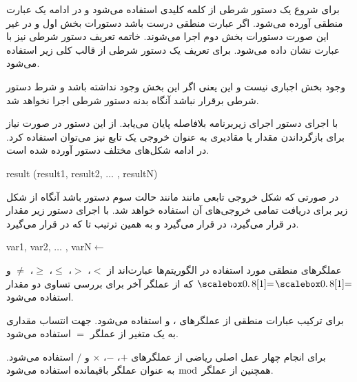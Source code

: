 برای شروع یک دستور شرطی از کلمه کلیدی {} استفاده می‌شود و در ادامه یک عبارت منطقی آورده می‌شود. اگر عبارت منطقی درست باشد دستورات بخش اول و در غیر این صورت دستورات بخش دوم اجرا می‌شوند. خاتمه تعریف دستور شرطی نیز با  عبارت {} نشان داده می‌شود. برای تعریف یک دستور شرطی از قالب کلی زیر استفاده می‌شود.
\begin{latin}
\begin{algorithmic}[1]
	\State	{}
\Else
	\State	{}
\EndIf
\end{algorithmic}
\end{latin}
وجود بخش {} اجباری نیست و این یعنی اگر این بخش وجود نداشته باشد و شرط دستور شرطی برقرار نباشد آنگاه بدنه دستور شرطی اجرا نخواهد شد.

با اجرای دستور {} اجرای زیربرنامه بلافاصله پایان می‌یابد. از این دستور در صورت نیاز برای بازگرداندن مقدار یا مقادیری به عنوان خروجی یک تابع نیز می‌توان استفاده کرد. در ادامه شکل‌های مختلف دستور {} آورده شده است.
\begin{latin}
\begin{algorithmic}[1]
\State	\Return
\State	\Return result
\State	\Return (result1, result2, $\ldots$ , resultN)
\end{algorithmic}
\end{latin}
در صورتی که شکل خروجی تابعی مانند {} مانند حالت سوم دستور {} باشد آنگاه از شکل زیر برای دریافت تمامی خروجی‌های آن استفاده خواهد شد. با اجرای دستور زیر مقدار {} در {} قرار می‌گیرد، {} در {} قرار می‌گیرد و به همین ترتیب تا {} که در {} قرار می‌گیرد.
\begin{latin}
\begin{algorithmic}[1]
\State	var1, var2, $\ldots$ , varN$\gets$
\end{algorithmic}
\end{latin}
عملگرهای منطقی مورد استفاده در الگوریتم‌ها عبارت‌اند از {$<$}، {$>$}، {$\leq$}، {$\geq$}، {$\neq$} و {$\isequal$} که از عملگر آخر برای بررسی تساوی دو مقدار استفاده می‌شود.

برای ترکیب عبارات منطقی از عملگرهای {}، {} و {} استفاده می‌شود. جهت انتساب مقداری به یک متغیر از عملگر {$=$} استفاده می‌شود.

برای انجام چهار عمل اصلی ریاضی از عملگرهای {$+$}، {$-$}، {$\times$} و {$/$} استفاده می‌شود. همچنین از عملگر {$\bmod$} به عنوان عملگر باقیمانده استفاده می‌شود.


